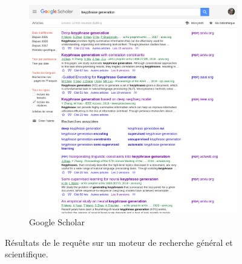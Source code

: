 \begin{figure}[!htbp]
    \begin{subfigure}{.8\textwidth}
        \centering
        \includegraphics[scale=0.30]{1_introduction/figures/google_scholar.png}
        \caption{Google Scholar}
        \label{fig:res_scholar}
    \end{subfigure}
    

    \caption{Résultats de le requête  sur un moteur de recherche général et scientifique.}
    \label{fig:res_request}
\end{figure}